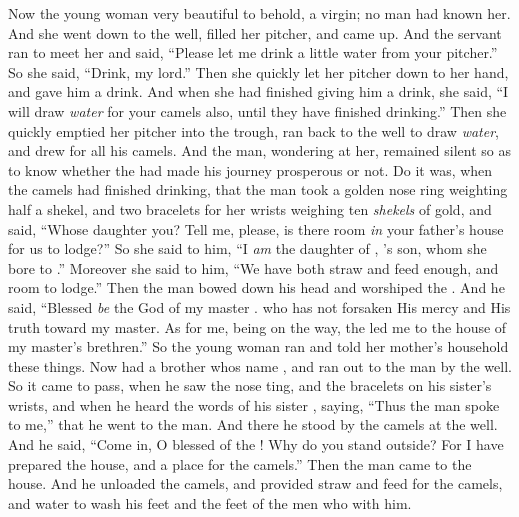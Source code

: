 \bverse Now the young woman \was very beautiful to behold, a virgin; no man had known her. And she went down to the well, filled her pitcher, and came up.
\bverse And the servant ran to meet her and said, ``Please let me drink a little water from your pitcher.''
\bverse So she said, ``Drink, my lord.'' Then she quickly let her pitcher down to her hand, and gave him a drink.
\bverse And when she had finished giving him a drink, she said, ``I will draw \textit{water} for your camels also, until they have finished drinking.''
\bverse Then she quickly emptied her pitcher into the trough, ran back to the well to draw \textit{water}, and drew for all his camels.
\bverse And the man, wondering at her, remained silent so as to know whether the \lord had made his journey prosperous or not.
\bverse Do it was, when the camels had finished drinking, that the man took a golden nose ring weighting half a shekel, and two bracelets for her wrists weighing ten \textit{shekels} of gold,
\bverse and said, ``Whose daughter \are you? Tell me, please, is there room \textit{in} your father's house for us to lodge?''
\bverse So she said to him, ``I \textit{am} the daughter of , 's son, whom she bore to .''
\bverse Moreover she said to him, ``We have both straw and feed enough, and room to lodge.''
\bverse Then the man bowed down his head and worshiped the \lord.
\bverse And he said, ``Blessed \textit{be} the \lord God of my master \Abraham. who has not forsaken His mercy and His truth toward my master. As for me, being on the way, the \lord led me to the house of my master's brethren.''
\bverse So the young woman ran and told her mother's household these things.
\bverse Now \Rebekah had a brother whos name \was \Laban, and \Laban ran out to the man by the well.
\bverse So it came to pass, when he saw the nose ting, and the bracelets on his sister's wrists, and when he heard the words of his sister \Rebekah, saying, ``Thus the man spoke to me,'' that he went to the man. And there he stood by the camels at the well.
\bverse And he said, ``Come in, O blessed of the \lord! Why do you stand outside? For I have prepared the house, and a place for the camels.''
\bverse Then the man came to the house. And he unloaded the camels, and provided straw and feed for the camels, and water to wash his feet and the feet of the men who \were with him.
